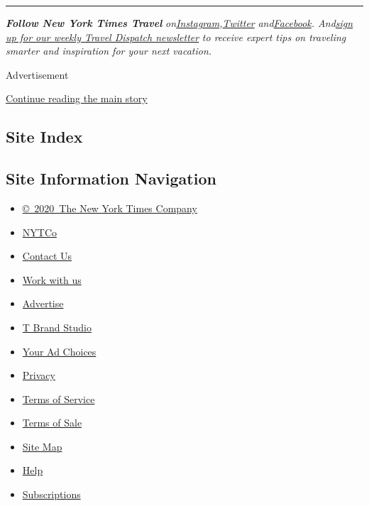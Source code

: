 \begin{center}\rule{0.5\linewidth}{\linethickness}\end{center}

\emph{\textbf{Follow New York Times Travel}}
\emph{on}\href{https://www.instagram.com/nytimestravel/}{\emph{Instagram}}\emph{,}\href{https://twitter.com/nytimestravel}{\emph{Twitter}}
\emph{and}\href{https://www.facebook.com/nytimestravel/}{\emph{Facebook}}\emph{.
And}\href{https://www.nytimes.com/newsletters/traveldispatch}{\emph{sign
up for our weekly Travel Dispatch newsletter}} \emph{to receive expert
tips on traveling smarter and inspiration for your next vacation.}

Advertisement

\protect\hyperlink{after-bottom}{Continue reading the main story}

\hypertarget{site-index}{%
\subsection{Site Index}\label{site-index}}

\hypertarget{site-information-navigation}{%
\subsection{Site Information
Navigation}\label{site-information-navigation}}

\begin{itemize}
\tightlist
\item
  \href{https://help.nytimes.com/hc/en-us/articles/115014792127-Copyright-notice}{©~2020~The
  New York Times Company}
\end{itemize}

\begin{itemize}
\tightlist
\item
  \href{https://www.nytco.com/}{NYTCo}
\item
  \href{https://help.nytimes.com/hc/en-us/articles/115015385887-Contact-Us}{Contact
  Us}
\item
  \href{https://www.nytco.com/careers/}{Work with us}
\item
  \href{https://nytmediakit.com/}{Advertise}
\item
  \href{http://www.tbrandstudio.com/}{T Brand Studio}
\item
  \href{https://www.nytimes.com/privacy/cookie-policy\#how-do-i-manage-trackers}{Your
  Ad Choices}
\item
  \href{https://www.nytimes.com/privacy}{Privacy}
\item
  \href{https://help.nytimes.com/hc/en-us/articles/115014893428-Terms-of-service}{Terms
  of Service}
\item
  \href{https://help.nytimes.com/hc/en-us/articles/115014893968-Terms-of-sale}{Terms
  of Sale}
\item
  \href{https://spiderbites.nytimes.com}{Site Map}
\item
  \href{https://help.nytimes.com/hc/en-us}{Help}
\item
  \href{https://www.nytimes.com/subscription?campaignId=37WXW}{Subscriptions}
\end{itemize}

